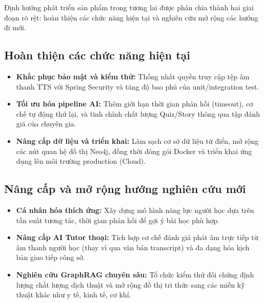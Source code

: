 \documentclass[../DoAn.tex]{subfiles}
\begin{document}
Định hướng phát triển sản phẩm trong tương lai được phân chia thành hai giai đoạn rõ rệt: hoàn thiện các chức năng hiện tại và nghiên cứu mở rộng các hướng đi mới.

\subsection{Hoàn thiện các chức năng hiện tại}
\begin{itemize}[itemsep=0pt,parsep=0pt,topsep=2pt,partopsep=0pt]
    \item \textbf{Khắc phục bảo mật và kiểm thử:} Thống nhất quyền truy cập tệp âm thanh TTS với Spring Security và tăng độ bao phủ của unit/integration test.
    \item \textbf{Tối ưu hóa pipeline AI:} Thêm giới hạn thời gian phản hồi (timeout), cơ chế tự động thử lại, và tinh chỉnh chất lượng Quiz/Story thông qua tập đánh giá của chuyên gia.
    \item \textbf{Nâng cấp dữ liệu và triển khai:} Làm sạch cơ sở dữ liệu từ điển, mở rộng các nút quan hệ đồ thị Neo4j, đồng thời đóng gói Docker và triển khai ứng dụng lên môi trường production (Cloud).
\end{itemize}

\subsection{Nâng cấp và mở rộng hướng nghiên cứu mới}
\begin{itemize}[itemsep=0pt,parsep=0pt,topsep=2pt,partopsep=0pt]
    \item \textbf{Cá nhân hóa thích ứng:} Xây dựng mô hình năng lực người học dựa trên tần suất tương tác, thời gian phản hồi để gợi ý bài học phù hợp.
    \item \textbf{Nâng cấp AI Tutor thoại:} Tích hợp cơ chế đánh giá phát âm trực tiếp từ âm thanh người học (thay vì qua văn bản transcript) và đa dạng hóa kịch bản giao tiếp công sở.
    \item \textbf{Nghiên cứu GraphRAG chuyên sâu:} Tổ chức kiểm thử đối chứng định lượng chất lượng dịch thuật và mở rộng đồ thị tri thức sang các miền kỹ thuật khác như y tế, kinh tế, cơ khí.
\end{itemize}
\end{document}

